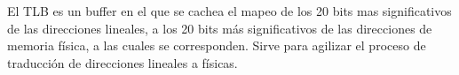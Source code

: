 El TLB es un buffer en el que se cachea el mapeo de los 20 bits mas significativos de las direcciones lineales, a los 20 bits más significativos de las direcciones de memoria física, a las cuales se corresponden. 
Sirve para agilizar el proceso de traducción de direcciones lineales a físicas.